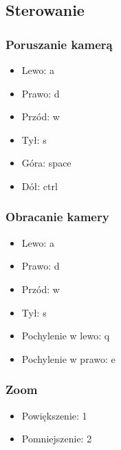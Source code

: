 \documentclass[11pt]{article}
\begin{document}
\subsection{Sterowanie}
\subsubsection{Poruszanie kamerą}
    \begin{itemize}
        \item Lewo: a
        \item Prawo: d
        \item Przód: w
        \item Tył: s
        \item Góra: space
        \item Dół: ctrl
    \end{itemize}
\subsubsection{Obracanie kamery}
    \begin{itemize}
        \item Lewo: a
        \item Prawo: d
        \item Przód: w
        \item Tył: s
        \item Pochylenie w lewo: q
        \item Pochylenie w prawo: e
    \end{itemize}
\subsubsection{Zoom}
    \begin{itemize}
        \item Powiększenie: 1
        \item Pomniejszenie: 2
    \end{itemize}
\end{document}
